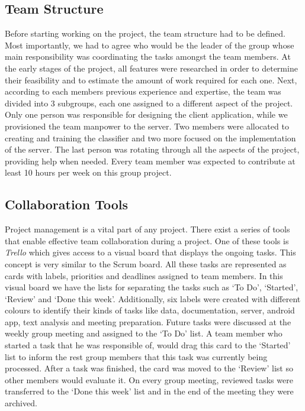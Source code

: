 \subsection{Team Structure} 
Before starting working on the project, the team structure had to be defined. Most importantly, we had to 
agree who would be the leader of the group whose main responsibility was coordinating the tasks amongst the 
team members. At the early stages of the project, all features were researched in order to 
determine their feasibility and to estimate the amount of work required for each one. Next, according to 
each members previous experience and expertise, the team was divided into 3 subgroups, each one assigned to 
a different aspect of the project. Only one person was responsible for designing the client application, while
we provisioned the team manpower to the server. Two members were allocated to creating and training 
the classifier and two more focused on the implementation of the server. The last person was rotating through 
all the aspects of the project, providing help when needed. Every team member was expected to contribute 
at least 10 hours per week on this group project.

\subsection{Collaboration Tools} 
Project management is a vital part of any project. There exist a series of tools that enable effective team 
collaboration during a project. One of these tools is \emph{Trello} which gives access to a visual board 
that displays the ongoing tasks. This concept is very similar to the Scrum board. All these tasks 
are represented as cards with labels, priorities and deadlines assigned to 
team members. In this visual board we have the lists for separating the tasks such as `To Do', `Started', `Review' and `Done this week'. 
Additionally, six labels were created with different colours to identify their kinds of tasks like data, 
documentation, server, android app, text analysis and meeting preparation. Future tasks were 
discussed at the weekly group meeting and assigned to the `To Do' list. A team member who started a task that he was responsible of, 
would drag this card to the `Started' list to inform the rest group members that this task was currently being processed. 
After a task was finished, the card was moved to the `Review' list so other members would evaluate it. 
On every group meeting, reviewed tasks were transferred to the `Done this week' list and in the end of the meeting they were
archived.

